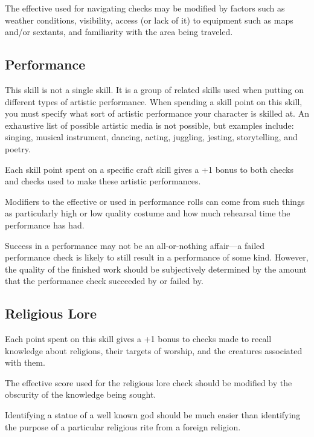 \begin{multicols*}{2}
The effective  used for navigating checks may be modified by factors such as weather conditions, visibility, access (or lack of it) to equipment such as maps and/or sextants, and familiarity with the area being traveled.

\subsection{Performance}\label{skill:Performance}
This skill is not a single skill. It is a group of related skills used when putting on different types of artistic performance. When spending a skill point on this skill, you must specify what sort of artistic performance your character is skilled at. An exhaustive list of possible artistic media is not possible, but examples include: singing, musical instrument, dancing, acting, juggling, jesting, storytelling, and poetry.

Each skill point spent on a specific craft skill gives a +1 bonus to both  checks and  checks used to make these artistic performances.

Modifiers to the effective  or  used in performance rolls can come from such things as particularly high or low quality costume and how much rehearsal time the performance has had.

Success in a performance may not be an all-or-nothing affair—a failed performance check is likely to still result in a performance of some kind. However, the quality of the finished work should be subjectively determined by the amount that the performance check succeeded by or failed by.

\subsection{Religious Lore}\label{skill:Religious Lore}
Each point spent on this skill gives a +1 bonus to  checks made to recall knowledge about religions, their targets of worship, and the creatures associated with them.

The effective  score used for the religious lore check should be modified by the obscurity of the knowledge being sought.

Identifying a statue of a well known god should be much easier than identifying the purpose of a particular religious rite from a foreign religion.


\end{multicols*}
